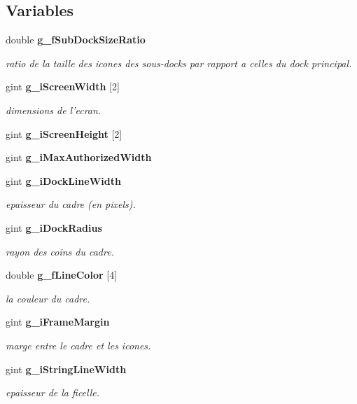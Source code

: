 \subsection*{Variables}
\begin{CompactItemize}
\item 
double {\bf g\_\-f\-Sub\-Dock\-Size\-Ratio}
\begin{CompactList}\small\item\em ratio de la taille des icones des sous-docks par rapport a celles du dock principal. \item\end{CompactList}\item 
gint {\bf g\_\-i\-Screen\-Width} [2]
\begin{CompactList}\small\item\em dimensions de l'ecran. \item\end{CompactList}\item 
gint {\bf g\_\-i\-Screen\-Height} [2]
\item 
gint {\bf g\_\-i\-Max\-Authorized\-Width}
\item 
gint {\bf g\_\-i\-Dock\-Line\-Width}
\begin{CompactList}\small\item\em epaisseur du cadre (en pixels). \item\end{CompactList}\item 
gint {\bf g\_\-i\-Dock\-Radius}
\begin{CompactList}\small\item\em rayon des coins du cadre. \item\end{CompactList}\item 
double {\bf g\_\-f\-Line\-Color} [4]
\begin{CompactList}\small\item\em la couleur du cadre. \item\end{CompactList}\item 
gint {\bf g\_\-i\-Frame\-Margin}
\begin{CompactList}\small\item\em marge entre le cadre et les icones. \item\end{CompactList}\item 
gint {\bf g\_\-i\-String\-Line\-Width}
\begin{CompactList}\small\item\em epaisseur de la ficelle. \item\end{CompactList}\item 

\end{CompactItemize}
